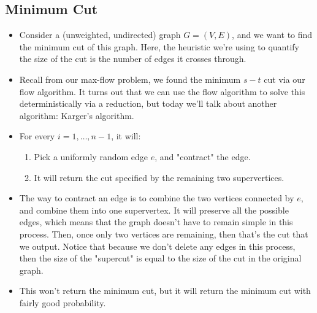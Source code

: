 \subsection{Minimum Cut} 
\begin{itemize}
	\item Consider a (unweighted, undirected) graph \( G = (V, E) \), and we want to find the minimum cut of this graph. Here, 
		the heuristic we're using to quantify the size of the cut is the number of edges it crosses through.
	\item Recall from our max-flow problem, we found the minimum \( s-t \) cut via our flow algorithm. It turns out that 
		 we can use the flow algorithm to solve this deterministically via a reduction, but today we'll talk about another 
		 algorithm: Karger's algorithm. 
	 \item For every \( i = 1, \dots, n- 1 \), it will:
		 \begin{enumerate}[label=\arabic*)]
		 	\item Pick a uniformly random edge \( e \), and "contract" the edge.
			\item It will return the cut specified by the remaining two supervertices.  
		 \end{enumerate}
	 \item The way to contract an edge is to combine the two vertices connected by \( e \), and combine them into one supervertex.
		 It will preserve all the possible edges, which means that the graph doesn't have to remain simple in this process.  
		 Then, once only two vertices are remaining, then that's the cut that we output. Notice that because we don't delete any
		 edges in this process, then the size of the "supercut" is equal to the size of the cut in the original graph. 
	 \item This won't return the minimum cut, but it will return the minimum cut with fairly good probability.  
\end{itemize}
